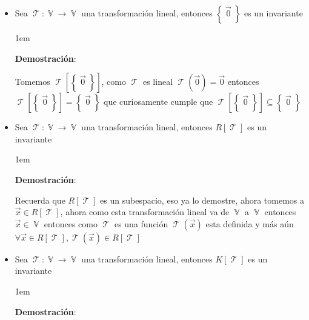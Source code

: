 \documentclass[12pt, fleqn]{report}                             %
\newenvironment{SmallIndentation}[1][0.75em]                    %
        {\begin{adjustwidth}{#1}{}\begin{footnotesize}}             %
        {\end{footnotesize}\end{adjustwidth}}                       %
\theoremstyle{break}                                            %
\DeclareMathOperator \VectorSet    {\mathbb{V}}                 %
\DeclareMathOperator \LinTrans {\mathcal{T}}                    %
\newcommand{\Set}[1]    {\left\{ \; #1 \; \right\}}             %
\begin{document}
                \begin{itemize}
                    \item Sea $\LinTrans: \VectorSet \to \VectorSet$ una transformación lineal, entonces
                        $\Set{\vec 0}$ es un invariante

                        \begin{SmallIndentation}[1em]
                            \textbf{Demostración}:
                            
                            Tomemos $\LinTrans[\Set{\vec 0}]$, como $\LinTrans$ es lineal $\LinTrans(\vec 0) = \vec 0$
                            entonces $\LinTrans[\Set{\vec 0}] = \Set{\vec 0}$ que curiosamente cumple que
                            $\LinTrans[\Set{\vec 0}] \subseteq \Set{\vec 0}$ 
                        
                        \end{SmallIndentation}

                    \item Sea $\LinTrans: \VectorSet \to \VectorSet$ una transformación lineal, entonces
                        $R[\LinTrans]$ es un invariante

                        \begin{SmallIndentation}[1em]
                            \textbf{Demostración}:
                            
                            Recuerda que $R[\LinTrans]$ es un subespacio, eso ya lo demostre, ahora tomemos 
                            a $\vec x \in R[\LinTrans]$, ahora como esta transformación lineal va de $\VectorSet$
                            a $\VectorSet$ entonces $\vec x \in \VectorSet$ entonces como $\LinTrans$
                            es una función $\LinTrans(\vec x)$ esta definida y más aún 
                            $\forall \vec x \in R[\LinTrans], \LinTrans(\vec x) \in R[\LinTrans]$
                        
                        \end{SmallIndentation}

                    \item Sea $\LinTrans: \VectorSet \to \VectorSet$ una transformación lineal, entonces
                        $K[\LinTrans]$ es un invariante

                        \begin{SmallIndentation}[1em]
                            \textbf{Demostración}:
                            

\end{SmallIndentation}
\end{itemize}
\end{document}
